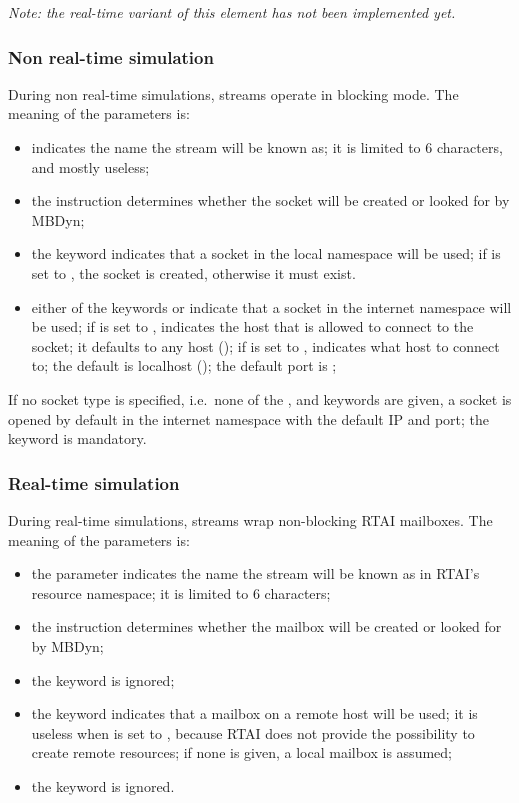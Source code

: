 \noindent
\emph{Note: the real-time variant of this element has not been implemented
yet.}

\subsubsection{Non real-time simulation}
During non real-time simulations, streams operate in blocking mode.
The meaning of the parameters is:
\begin{itemize}
\item {} indicates the name the stream
will be known as; it is limited to 6 characters, and mostly useless;
\item the instruction  determines whether the socket will be
created or looked for by MBDyn;
\item the keyword  indicates that a socket 
in the local namespace will be used; if  is set to ,
the socket is created, otherwise it must exist.
\item either of the keywords  or  indicate that a socket
in the internet namespace will be used;
if  is set to ,  indicates 
the host that is allowed to connect to the socket; it defaults 
to any host (); if  is set to ,
 indicates what host to connect to; the default 
is localhost (); the default port is ;
\end{itemize}
If no socket type is specified, i.e.\ none of the ,  
and  keywords are given, a socket is opened by default 
in the internet namespace with the default IP and port; the 
keyword is mandatory.

\subsubsection{Real-time simulation}
During real-time simulations, streams wrap non-blocking RTAI mailboxes.
The meaning of the parameters is:
\begin{itemize}
\item the parameter  indicates the name the stream
will be known as in RTAI's resource namespace; it is limited to 6 characters;
\item the instruction  determines whether the mailbox will be
created or looked for by MBDyn;
\item the keyword  is ignored;
\item the keyword  indicates that a mailbox on a remote host 
will be used; it is useless when  is set to , because
RTAI does not provide the possibility to create remote resources;
if none is given, a local mailbox is assumed;
\item the keyword  is ignored.
\end{itemize}

